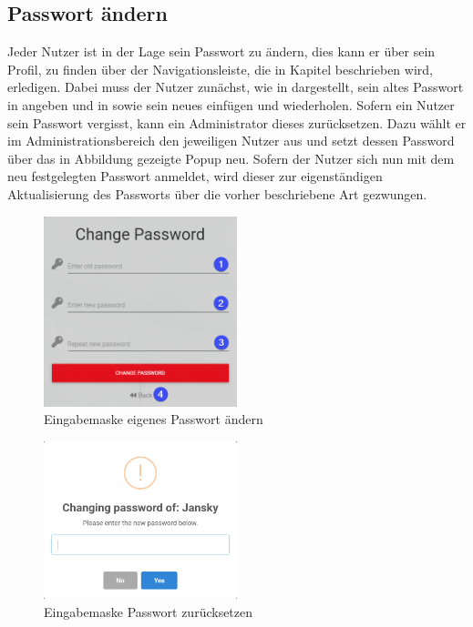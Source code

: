 \subsection{Passwort ändern}

Jeder Nutzer ist in der Lage sein Passwort zu ändern, dies kann er über sein Profil, zu finden über der Navigationsleiste, die in Kapitel  beschrieben wird, erledigen.
Dabei muss der Nutzer zunächst, wie in  dargestellt, sein altes Passwort in \desOne angeben und in \desTwo sowie \desThree sein neues einfügen und wiederholen.
Sofern ein Nutzer sein Passwort vergisst, kann ein Administrator dieses zurücksetzen.
Dazu wählt er im Administrationsbereich  den jeweiligen Nutzer aus und setzt dessen Password über das in Abbildung  gezeigte Popup neu.
Sofern der Nutzer sich nun mit dem neu festgelegten Passwort anmeldet, wird dieser zur eigenständigen Aktualisierung des Passworts über die vorher beschriebene Art gezwungen.

\begin{figure}[H]
	\centering
	\includegraphics[width=0.5\textwidth, keepaspectratio]{img/guide/ChangeOwnPassword.png}
	\captionsetup{justification=centering, format=plain}
	\caption[Eingabemaske eigenes Passwort ändern]{Eingabemaske eigenes Passwort ändern \\\quelleScreenshot}
	\label{fig:ChangeOwnPassword}
\end{figure}

\begin{figure}[H]
	\centering
	\includegraphics[width=0.5\textwidth, keepaspectratio]{img/guide/ChangePassword.png}
	\captionsetup{justification=centering, format=plain}
	\caption[Eingabemaske Passwort zurücksetzen]{Eingabemaske Passwort zurücksetzen \\\quelleScreenshot}
	\label{fig:ChangePasswordOfUser}
\end{figure}

